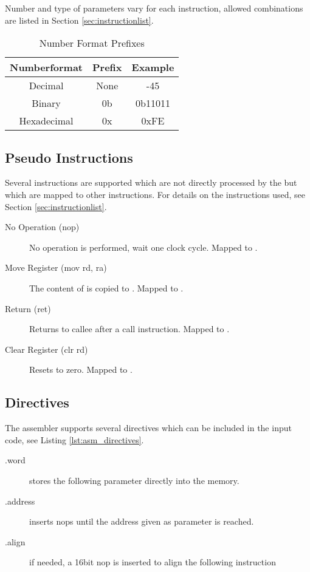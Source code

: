 Number and type of parameters vary for each instruction, allowed combinations are listed in Section \ref{sec:instructionlist}.

\begin{table}
	\begin{center}
	\begin{tabular}{|c|c|c|}
	\hline 
	Numberformat & Prefix & Example\\
	\hline\hline
	Decimal      & None   & -45 \\ 
	Binary       & 0b     & 0b11011 \\ 
	Hexadecimal  & 0x     & 0xFE \\ 
	\hline 
	\end{tabular} 
	\end{center}
	\caption{Number Format Prefixes}
	\label{tbl:asm_numberformats}
\end{table}

\subsection{Pseudo Instructions}
Several instructions are supported which are not directly processed by the \procname but which are mapped to other instructions.
For details on the instructions used, see Section \ref{sec:instructionlist}.
\begin{description}
\item[No Operation (nop)] No operation is performed, wait one clock cycle. Mapped to .
\item[Move Register (mov rd, ra)] The content of  is copied to . Mapped to .
\item[Return (ret)] Returns to callee after a call instruction. Mapped to .
\item[Clear Register (clr rd)] Resets  to zero. Mapped to .
\end{description}

\subsection{Directives}
The assembler supports several directives which can be included in the input code, see Listing \ref{lst:asm_directives}.
\begin{description}
\item[.word]stores the following parameter directly into the memory.
\item[.address]inserts nops until the address given as parameter is reached.
\item[.align]if needed, a 16bit nop is inserted to align the following instruction
\end{description}

